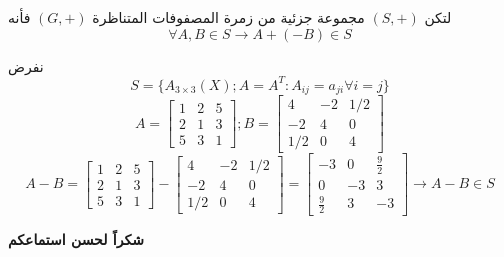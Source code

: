 		\begin{frame}
			\begin{theorem}
				لتكن $(S, +)$ مجموعة جزئية من زمرة المصفوفات المتناظرة $(G, +)$ فأنه
				\[
				\forall A, B\in S \to A + (-B) \in S
				\]
			\end{theorem}
		\end{frame}
		
		\begin{frame}
			\begin{example}
				نفرض
				\[
				S = \{A_{3\times 3}(X) ; A = A^T : A_{ij} = a_{ji} \forall i=j\}
				\]
				\[
				A = \begin{bmatrix}
					1 & 2 & 5 \\
					2 & 1 & 3 \\
					5 & 3 & 1
				\end{bmatrix} ; B = \begin{bmatrix}
					4 & -2 & 1/2 \\
					-2 & 4 & 0 \\
					1/2 & 0 & 4
				\end{bmatrix}\]
				\[
				A - B = \begin{bmatrix}
					1 & 2 & 5 \\
					2 & 1 & 3 \\
					5 & 3 & 1
				\end{bmatrix} - \begin{bmatrix}
					4 & -2 & 1/2 \\
					-2 & 4 & 0 \\
					1/2 & 0 & 4
				\end{bmatrix} = \begin{bmatrix}
					-3 & 0 & \frac{9}{2} \\
					0 & -3 & 3 \\
					\frac{9}{2} & 3 & -3
				\end{bmatrix} \to A - B \in S
				\]
			\end{example}
		\end{frame}
		
	\begin{frame}
		\begin{center}
			\Huge
			\textbf{شكراً لحسن استماعكم}
		\end{center}
	\end{frame}
